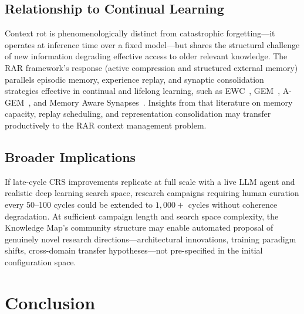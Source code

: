 \documentclass[conference]{IEEEtran}
\begin{document}
\subsection{Relationship to Continual Learning}
Context rot is phenomenologically distinct from catastrophic forgetting---it operates at inference time over a fixed model---but shares the structural challenge of new information degrading effective access to older relevant knowledge. The RAR framework's response (active compression and structured external memory) parallels episodic memory, experience replay, and synaptic consolidation strategies effective in continual and lifelong learning, such as EWC~\citep{kirkpatrick2017ewc}, GEM~\citep{lopezpaz2017gem}, A-GEM~\citep{chaudhry2018efficient}, and Memory Aware Synapses~\citep{aljundi2018memory}. Insights from that literature on memory capacity, replay scheduling, and representation consolidation may transfer productively to the RAR context management problem.

\subsection{Broader Implications}
If late-cycle CRS improvements replicate at full scale with a live LLM agent and realistic deep learning search space, research campaigns requiring human curation every 50--100 cycles could be extended to $1{,}000{+}$ cycles without coherence degradation. At sufficient campaign length and search space complexity, the Knowledge Map's community structure may enable automated proposal of genuinely novel research directions---architectural innovations, training paradigm shifts, cross-domain transfer hypotheses---not pre-specified in the initial configuration space.

\section{Conclusion}
\end{document}
